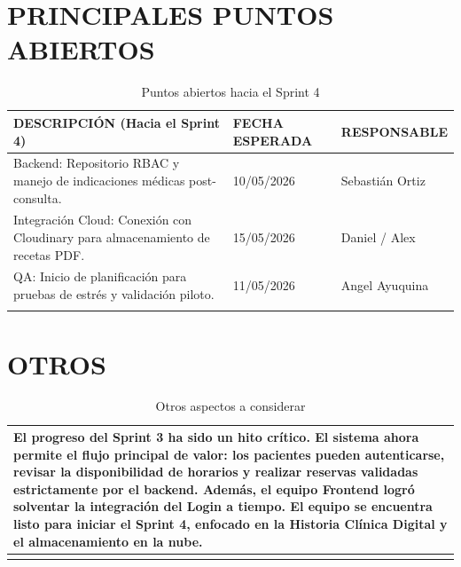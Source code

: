 \documentclass[11pt]{article}
\begin{document}
\section*{PRINCIPALES PUNTOS ABIERTOS}

\begin{longtable}{|p{7cm}|p{3.5cm}|p{3.5cm}|}
    \hline
    \textbf{DESCRIPCIÓN (Hacia el Sprint 4)} & \textbf{FECHA ESPERADA} & \textbf{RESPONSABLE} \\
    \hline
    Backend: Repositorio RBAC y manejo de indicaciones médicas post-consulta. & 10/05/2026 & Sebastián Ortiz \\
    \hline
    Integración Cloud: Conexión con Cloudinary para almacenamiento de recetas PDF. & 15/05/2026 & Daniel / Alex \\
    \hline
    QA: Inicio de planificación para pruebas de estrés y validación piloto. & 11/05/2026 & Angel Ayuquina \\
    \hline
    \caption{Puntos abiertos hacia el Sprint 4}
    \label{tab:puntos_abiertos}
\end{longtable}

\section*{OTROS}

\begin{longtable}{|p{}|}
    \hline
    El progreso del Sprint 3 ha sido un hito crítico. El sistema ahora permite el flujo principal de valor: los pacientes pueden autenticarse, revisar la disponibilidad de horarios y realizar reservas validadas estrictamente por el backend. Además, el equipo Frontend logró solventar la integración del Login a tiempo. El equipo se encuentra listo para iniciar el Sprint 4, enfocado en la Historia Clínica Digital y el almacenamiento en la nube. \\
    \hline
    \caption{Otros aspectos a considerar}
    \label{tab:otros}
\end{longtable}
\end{document}
